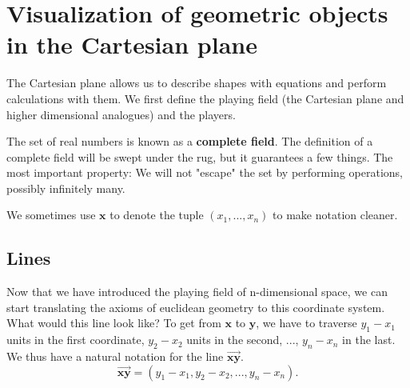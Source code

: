 \section{Visualization of geometric objects in the Cartesian plane}
The Cartesian plane allows us to describe shapes with equations and perform calculations with them. We first define the playing field (the Cartesian plane and higher dimensional analogues) and the players.
\begin{remark}
	The set of real numbers is known as a \textbf{complete field}. The definition of a complete field will be swept under the rug, but it guarantees a few things. The most important property: We will not "escape" the set by performing operations, possibly infinitely many.
\end{remark}
\begin{remark}
	We sometimes use $\mathbf{x}$ to denote the tuple $(x_1,...,x_n)$ to make notation cleaner.
\end{remark}
\subsection{Lines}
Now that we have introduced the playing field of n-dimensional space, we can start translating the axioms of euclidean geometry to this coordinate system.
What would this line look like? To get from $\mathbf{x}$ to $\mathbf{y}$, we have to traverse $y_1-x_1$ units in the first coordinate, $y_2-x_2$ units in the second, ..., $y_n-x_n$ in the last. We thus have a natural notation for the line $\overrightarrow{\mathbf{xy}}$.
\[
 \overrightarrow{\mathbf{xy}}=(y_1-x_1,y_2-x_2,...,y_n-x_n).
\]

